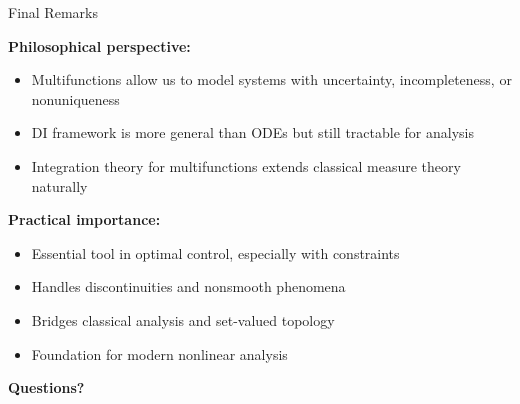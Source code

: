 \documentclass[aspectratio=169,10pt]{beamer}
\theoremstyle{definition}
\begin{document}
\begin{frame}{Final Remarks}

\textbf{Philosophical perspective:}
\begin{itemize}
    \item Multifunctions allow us to model systems with uncertainty, incompleteness, or nonuniqueness
    \item DI framework is more general than ODEs but still tractable for analysis
    \item Integration theory for multifunctions extends classical measure theory naturally
\end{itemize}

\vspace{0.3cm}

\textbf{Practical importance:}
\begin{itemize}
    \item Essential tool in optimal control, especially with constraints
    \item Handles discontinuities and nonsmooth phenomena
    \item Bridges classical analysis and set-valued topology
    \item Foundation for modern nonlinear analysis
\end{itemize}

\vspace{0.3cm}

\begin{center}
\textbf{\large Questions?}
\end{center}

\end{frame}
\end{document}
